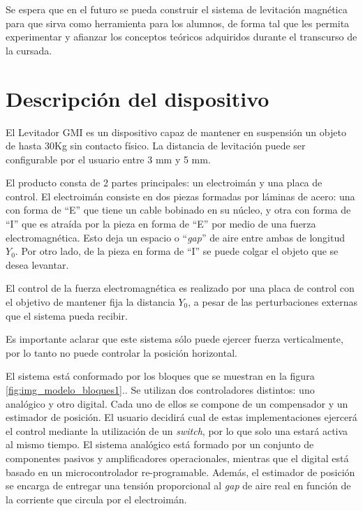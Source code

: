 \noindent Se espera que en el futuro se pueda construir el sistema de levitación magnética para que sirva como herramienta para los alumnos, de forma tal que les permita experimentar y afianzar los conceptos teóricos adquiridos durante el transcurso de la cursada.



\section{Descripción del dispositivo}

\noindent El Levitador GMI es un dispositivo capaz de mantener en suspensión un objeto de hasta 30Kg sin contacto físico. La distancia de levitación puede ser configurable por el usuario entre 3 mm y 5 mm. 

\noindent El producto consta de 2 partes principales: un electroim\'{a}n y una placa de control. El electroim\'{a}n consiste en dos piezas formadas por l\'{a}minas de acero: una con forma de ``E'' que tiene un cable bobinado en su n\'{u}cleo, y otra con forma de ``I'' que es atra\'{i}da por la pieza en forma de ``E'' por medio de una fuerza electromagn\'{e}tica. Esto deja un espacio o ``\textit{gap}'' de aire entre ambas de longitud $Y_0$. Por otro lado, de la pieza en forma de ``I'' se puede colgar el objeto que se desea levantar.

\noindent El control de la fuerza electromagn\'{e}tica es realizado por una placa de control con el objetivo de mantener fija la distancia $Y_0$, a pesar de las perturbaciones externas que el sistema pueda recibir. 

\noindent Es importante aclarar que este sistema s\'{o}lo puede ejercer fuerza verticalmente, por lo tanto no puede controlar la posici\'{o}n horizontal.


\noindent El sistema est\'{a} conformado por los bloques que se muestran en la figura \ref{fig:img_modelo_bloques1}.. Se utilizan dos controladores distintos: uno anal\'{o}gico y otro digital. Cada uno de ellos se compone de un compensador y un estimador de posici\'{o}n.  El usuario decidir\'{a} cual de estas implementaciones ejercer\'{a} el control mediante la utilizaci\'{o}n de un \textit{switch}, por lo que solo una estar\'{a} activa al mismo tiempo. El sistema anal\'{o}gico est\'{a} formado por un conjunto de componentes pasivos y amplificadores operacionales, mientras que el digital est\'{a} basado en un microcontrolador re-programable. Adem\'{a}s, el estimador de posici\'{o}n se encarga de  entregar una tensi\'{o}n proporcional al \textit{gap }de aire real en funci\'{o}n de  la corriente que circula por el electroim\'{a}n.


